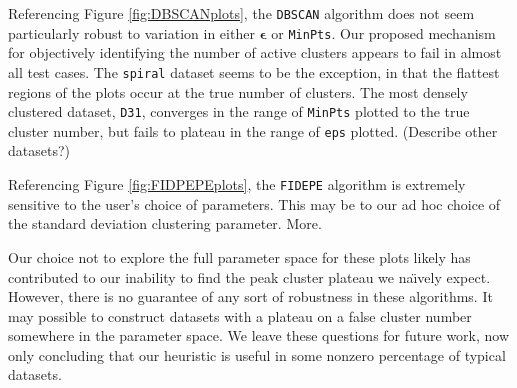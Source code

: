 \documentclass[12pt]{article}
\begin{document}
\par Referencing Figure \ref{fig:DBSCANplots}, the \texttt{DBSCAN} algorithm does not seem particularly robust to variation in either $\boldsymbol{\epsilon}$ or \texttt{MinPts}. Our proposed mechanism for objectively identifying the number of active clusters appears to fail in almost all test cases. The \texttt{spiral} dataset seems to be the exception, in that the flattest regions of the plots occur at the true number of clusters. The most densely clustered dataset, \texttt{D31}, converges in the range of \texttt{MinPts} plotted to the true cluster number, but fails to plateau in the range of \texttt{eps} plotted. (Describe other datasets?)
\par Referencing Figure \ref{fig:FIDPEPEplots}, the \texttt{FIDEPE} algorithm is extremely sensitive to the user's choice of parameters. This may be to our ad hoc choice of the standard deviation clustering parameter. More.

\par Our choice not to explore the full parameter space for these plots likely has contributed to our inability to find the peak cluster plateau we na\"\i vely expect. However, there is no guarantee of any sort of robustness in these algorithms. It may possible to construct datasets with a plateau on a false cluster number somewhere in the parameter space. We leave these questions for future work, now only concluding that our heuristic is useful in some nonzero percentage of typical datasets.
\clearpage


\end{document}
